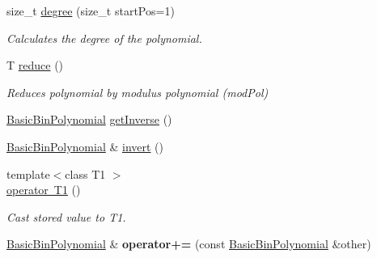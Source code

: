 \begin{DoxyCompactItemize}
size\+\_\+t \mbox{\hyperlink{class_g_flinalg_1_1_basic_bin_polynomial_ace68fc139713e8efa3d9c60d5238caf4}{degree}} (size\+\_\+t start\+Pos=1)
\begin{DoxyCompactList}\small\item\em Calculates the degree of the polynomial. \end{DoxyCompactList}\item 
\mbox{\label{class_g_flinalg_1_1_basic_bin_polynomial_aa284c4cae139cf2895363e7c0adf2d0a}} 
T \mbox{\hyperlink{class_g_flinalg_1_1_basic_bin_polynomial_aa284c4cae139cf2895363e7c0adf2d0a}{reduce}} ()
\begin{DoxyCompactList}\small\item\em Reduces polynomial by modulus polynomial (mod\+Pol) \end{DoxyCompactList}\item 
\mbox{\hyperlink{class_g_flinalg_1_1_basic_bin_polynomial}{Basic\+Bin\+Polynomial}} \mbox{\hyperlink{class_g_flinalg_1_1_basic_bin_polynomial_ab2cbcd0f6bb296208a7c6430281c2cca}{get\+Inverse}} ()
\item 
\mbox{\hyperlink{class_g_flinalg_1_1_basic_bin_polynomial}{Basic\+Bin\+Polynomial}} \& \mbox{\hyperlink{class_g_flinalg_1_1_basic_bin_polynomial_a8094917d7e143f78f735f23830f43d8a}{invert}} ()
\item 
\mbox{\label{class_g_flinalg_1_1_basic_bin_polynomial_ada21c9246ef9043ab94bdebbc11d9fee}} 
{\footnotesize template$<$class T1 $>$ }\\\mbox{\hyperlink{class_g_flinalg_1_1_basic_bin_polynomial_ada21c9246ef9043ab94bdebbc11d9fee}{operator T1}} ()
\begin{DoxyCompactList}\small\item\em Cast stored value to T1. \end{DoxyCompactList}\item 
\mbox{\label{class_g_flinalg_1_1_basic_bin_polynomial_a58cb69fe885661af25bf4931abaaad17}} 
\mbox{\hyperlink{class_g_flinalg_1_1_basic_bin_polynomial}{Basic\+Bin\+Polynomial}} \& {\bfseries operator+=} (const \mbox{\hyperlink{class_g_flinalg_1_1_basic_bin_polynomial}{Basic\+Bin\+Polynomial}} \&other)
\item 
\mbox{\label{class_g_flinalg_1_1_basic_bin_polynomial_af0c6fb43360af5dbc4bb82037eda7299}} 

\end{DoxyCompactItemize}
